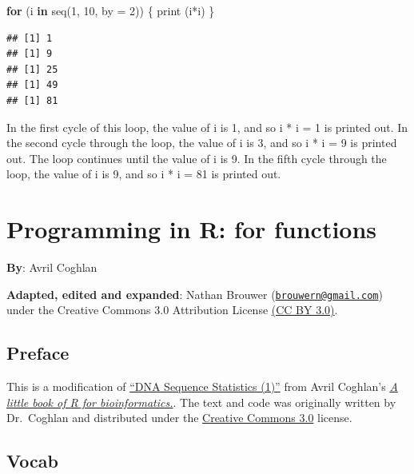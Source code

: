 \documentclass[
]{book}
\newenvironment{Shaded}{\begin{snugshade}}{\end{snugshade}}
\newcommand{\AttributeTok}[1]{\textcolor[rgb]{0.77,0.63,0.00}{#1}}
\newcommand{\ControlFlowTok}[1]{\textcolor[rgb]{0.13,0.29,0.53}{\textbf{#1}}}
\newcommand{\DecValTok}[1]{\textcolor[rgb]{0.00,0.00,0.81}{#1}}
\newcommand{\FunctionTok}[1]{\textcolor[rgb]{0.00,0.00,0.00}{#1}}
\newcommand{\NormalTok}[1]{#1}
\newcommand{\SpecialCharTok}[1]{\textcolor[rgb]{0.00,0.00,0.00}{#1}}
\begin{document}
\begin{Shaded}
\begin{Highlighting}[]
\ControlFlowTok{for}\NormalTok{ (i }\ControlFlowTok{in} \FunctionTok{seq}\NormalTok{(}\DecValTok{1}\NormalTok{, }\DecValTok{10}\NormalTok{, }\AttributeTok{by =} \DecValTok{2}\NormalTok{)) \{ }
  \FunctionTok{print}\NormalTok{ (i}\SpecialCharTok{*}\NormalTok{i) }
\NormalTok{  \}}
\end{Highlighting}
\end{Shaded}

\begin{verbatim}
## [1] 1
## [1] 9
## [1] 25
## [1] 49
## [1] 81
\end{verbatim}

In the first cycle of this loop, the value of i is 1, and so i * i = 1 is printed out. In the second cycle through the loop, the value of i is 3, and so i * i = 9 is printed out. The loop continues until the value of i is 9. In the fifth cycle through the loop, the value of i is 9, and so i * i = 81 is printed out.

\hypertarget{programming-in-r-for-functions}{%
\chapter{Programming in R: for functions}\label{programming-in-r-for-functions}}

\textbf{By}: Avril Coghlan

\textbf{Adapted, edited and expanded}: Nathan Brouwer (\href{mailto:brouwern@gmail.com}{\nolinkurl{brouwern@gmail.com}}) under the Creative Commons 3.0 Attribution License \href{https://creativecommons.org/licenses/by/3.0/}{(CC BY 3.0)}.

\hypertarget{preface-3}{%
\section{Preface}\label{preface-3}}

This is a modification of \href{https://a-little-book-of-r-for-bioinformatics.readthedocs.io/en/latest/src/chapter1.html}{``DNA Sequence Statistics (1)''} from Avril Coghlan's \href{https://a-little-book-of-r-for-bioinformatics.readthedocs.io/en/latest/index.html}{\emph{A little book of R for bioinformatics.}}. The text and code was originally written by Dr.~Coghlan and distributed under the \href{https://creativecommons.org/licenses/by/3.0/us/}{Creative Commons 3.0} license.

\hypertarget{vocab-1}{%
\section{Vocab}\label{vocab-1}}
\end{document}
